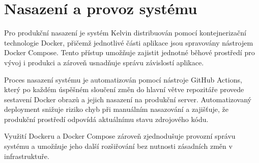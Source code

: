 \section{Nasazení a provoz systému}
\label{sec:kelvin-deployment}

Pro produkční nasazení je systém Kelvin distribuován pomocí kontejnerizační technologie Docker, přičemž jednotlivé části aplikace jsou spravovány nástrojem Docker Compose.
Tento přístup umožňuje zajistit jednotné běhové prostředí pro vývoj i produkci a zároveň usnadňuje správu závislostí aplikace.

Proces nasazení systému je automatizován pomocí nástroje GitHub Actions, který po každém úspěšném sloučení změn do hlavní větve repozitáře provede sestavení Docker obrazů a jejich nasazení na produkční server.
Automatizovaný deployment snižuje riziko chyb při manuálním nasazování a zajišťuje, že produkční prostředí odpovídá aktuálnímu stavu zdrojového kódu.

Využití Dockeru a Docker Compose zároveň zjednodušuje provozní správu systému a umožňuje jeho další rozšiřování bez nutnosti zásadních změn v infrastruktuře.

\endinput